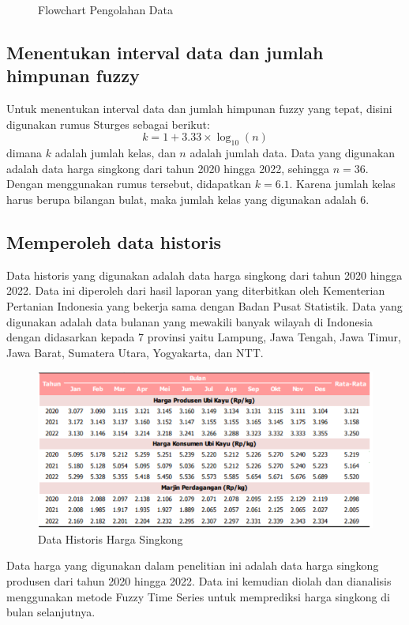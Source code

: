 \documentclass[conference]{IEEEtran}
\begin{document}
\begin{figure}[htbp]
    \caption{Flowchart Pengolahan Data}
\end{figure}


\subsection{Menentukan interval data dan jumlah himpunan fuzzy}\label{AA}
Untuk menentukan interval data dan jumlah himpunan fuzzy yang tepat, disini digunakan rumus Sturges sebagai berikut:
\begin{equation}
    k = 1 + 3.33 \times \log_{10}(n)
\end{equation}
dimana $k$ adalah jumlah kelas, dan $n$ adalah jumlah data. Data yang digunakan adalah data harga singkong dari tahun 2020 hingga 2022, sehingga $n = 36$. Dengan menggunakan rumus tersebut, didapatkan $k = 6.1$. Karena jumlah kelas harus berupa bilangan bulat, maka jumlah kelas yang digunakan adalah 6.
\subsection{Memperoleh data historis}
Data historis yang digunakan adalah data harga singkong dari tahun 2020 hingga 2022. Data ini diperoleh dari hasil laporan yang diterbitkan oleh Kementerian Pertanian Indonesia yang bekerja sama dengan Badan Pusat Statistik. Data yang digunakan adalah data bulanan yang mewakili banyak wilayah di Indonesia dengan didasarkan kepada 7 provinsi yaitu Lampung, Jawa Tengah, Jawa Timur, Jawa Barat, Sumatera Utara, Yogyakarta, dan NTT.

\begin{figure}[H]
    \centering
    \includegraphics[scale=0.5]{images/Data Historis.png} 
    \caption{Data Historis Harga Singkong}
\end{figure}
Data harga yang digunakan dalam penelitian ini adalah data harga singkong produsen dari tahun 2020 hingga 2022. Data ini kemudian diolah dan dianalisis menggunakan metode Fuzzy Time Series untuk memprediksi harga singkong di bulan selanjutnya.
\end{document}
